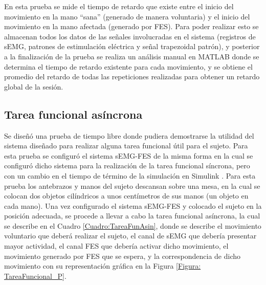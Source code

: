 En esta prueba se mide el tiempo de retardo que existe entre el inicio del movimiento en la mano ``sana'' (generado de manera voluntaria) y el inicio del movimiento en la mano afectada (generado por FES). Para poder realizar esto se almacenan todos los datos de las señales involucradas en el sistema (registros de sEMG, patrones de estimulación eléctrica y señal trapezoidal patrón), y posterior a la finalización de la prueba se realiza un análisis manual en MATLAB\textregistered \; donde se determina el tiempo de retardo existente para cada movimiento, y se obtiene el promedio del retardo de todas las repeticiones realizadas para obtener un retardo global de la sesión.

\subsection{Tarea funcional asíncrona}

Se diseñó una prueba de tiempo libre donde pudiera demostrarse la utilidad del sistema diseñado para realizar alguna tarea funcional útil para el sujeto. Para esta prueba se configuró el sistema sEMG-FES de la misma forma en la cual se configuró dicho sistema para la realización de la tarea funcional síncrona, pero con un cambio en el tiempo de término de la simulación en Simulink \textregistered . Para esta prueba los antebrazos y manos del sujeto descansan sobre una mesa, en la cual se colocan dos objetos cilíndricos a unos centímetros de sus manos (un objeto en cada mano). Una vez configurado el sistema sEMG-FES y colocado el sujeto en la posición adecuada, se procede a llevar a cabo la tarea funcional asíncrona, la cual se describe en el Cuadro \ref{Cuadro:TareaFunAsin}, donde se describe el movimiento voluntario que deberá realizar el sujeto, el canal de sEMG que debería presentar mayor actividad, el canal FES que debería activar dicho movimiento, el movimiento generado por FES que se espera, y la correspondencia de dicho movimiento con su representación gráfica en la Figura \ref{Figura: TareaFuncional_P}.


